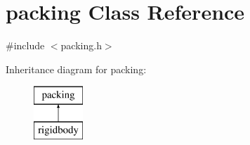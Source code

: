 \hypertarget{classpacking}{}\section{packing Class Reference}
\label{classpacking}


{\ttfamily \#include $<$packing.\+h$>$}

Inheritance diagram for packing\+:\begin{figure}[H]
\begin{center}
\leavevmode
\includegraphics[height=2.000000cm]{classpacking}
\end{center}
\end{figure}
